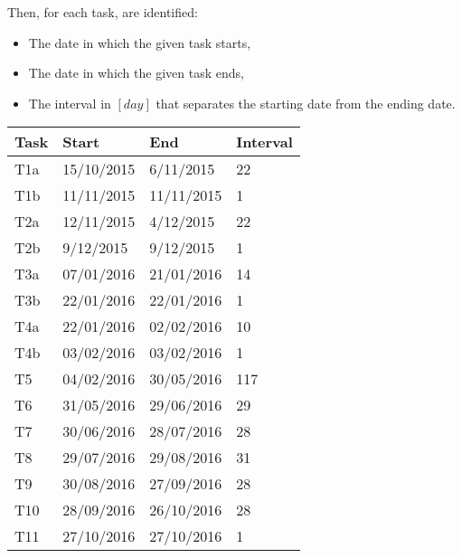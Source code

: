 Then, for each task, are identified:
\begin{itemize}
	\item The date in which the given task starts,
	\item The date in which the given task ends,
	\item The interval in $[day]$ that separates the starting date from the ending date.
\end{itemize}
\begin{center}
	\begin{tabulary}{\linewidth\tymin=70pt}{Y{1cm}|Y{3cm}|Y{3cm}|Y{1.7cm}}
		\textbf{Task} & \textbf{Start} & \textbf{End} & \textbf{Interval} \\ \hline
		T1a & 15/10/2015 & 6/11/2015 & 22\\ \hline
		T1b & 11/11/2015 & 11/11/2015 & 1\\ \hline
		T2a & 12/11/2015 & 4/12/2015 & 22\\ \hline
		T2b & 9/12/2015 & 9/12/2015 & 1\\ \hline
		T3a & 07/01/2016 & 21/01/2016 & 14\\ \hline
		T3b & 22/01/2016 & 22/01/2016 & 1\\ \hline
		T4a & 22/01/2016 & 02/02/2016 & 10\\ \hline
		T4b & 03/02/2016 & 03/02/2016 & 1\\ \hline
		T5 & 04/02/2016 & 30/05/2016 & 117\\ \hline
		T6 & 31/05/2016 & 29/06/2016 & 29\\ \hline
		T7 & 30/06/2016 & 28/07/2016 & 28\\ \hline
		T8 & 29/07/2016 & 29/08/2016 & 31\\ \hline
		T9 & 30/08/2016 & 27/09/2016 & 28\\ \hline
		T10 & 28/09/2016 & 26/10/2016 & 28\\ \hline
		T11 & 27/10/2016 & 27/10/2016 & 1\\
	\end{tabulary}
\end{center}
%
